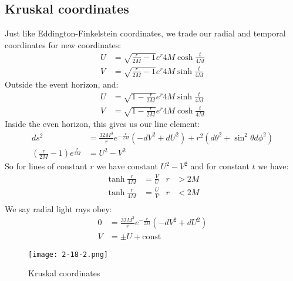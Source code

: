\subsection{Kruskal coordinates}
Just like Eddington-Finkelstein coordinates, we trade our radial and temporal coordinates for new coordinates:
\begin{align*}
	U &= \sqrt{\frac{r}{2M} -1}e^{r}{4M} \cosh \frac{t}{4M} \\
	V &= \sqrt{\frac{r}{2M} - 1}e^{r}{4M} \sinh \frac{t}{4M}
\end{align*}
Outside the event horizon, and:
\begin{align*}
	U &= \sqrt{1-\frac{r}{2M}}e^{r}{4M} \sinh \frac{t}{4M} \\
	V &= \sqrt{1-\frac{r}{2M}}e^{r}{4M} \cosh \frac{t}{4M}
\end{align*}
Inside the even horizon, this gives us our line element:
\begin{align*}
	ds^2 &= \frac{32 M^3}{r} e^{-\frac{r}{2M}}(-dV^2 + dU^2) + r^2 (d\theta^2 + \sin^2\theta d\phi^2) \\
	\left(\frac{r}{2M} -1\right)e^\frac{r}{2M} &= U^2 -V^2
\end{align*}
So for lines of constant $r$ we have constant $U^2 - V^2$ and for constant $t$ we have:
\begin{align*}
	\tanh\frac{r}{4M} &= \frac{V}{U} & r &> 2M \\
	\tanh\frac{r}{4M} &= \frac{U}{V} & r &< 2M \\
\end{align*}
We say radial light rays obey:
\begin{align*}
	0 &= \frac{32 M^3}{r} e^{-\frac{r}{2M}}(-dV^2 + dU^2) \\
	V &= \pm U + \text{const}
\end{align*}
\begin{figure*}[h]
	\centering
	\texttt{[image: 2-18-2.png]}
	\caption*{Kruskal coordinates}
\end{figure*}

